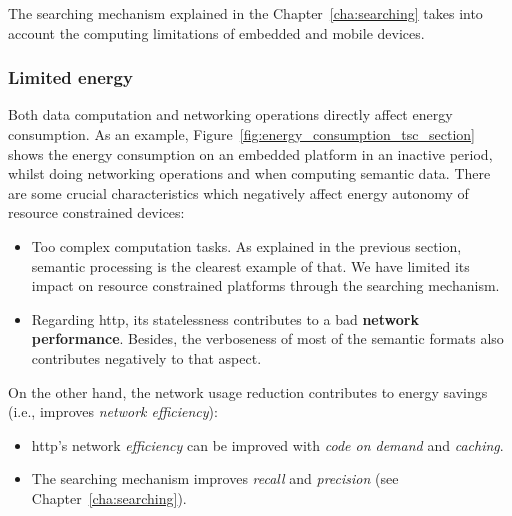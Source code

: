 The searching mechanism explained in the Chapter~\ref{cha:searching} takes into account the computing limitations of embedded and mobile devices.



\subsubsection{Limited energy}

Both data computation and networking operations directly affect energy consumption.
As an example, Figure~\ref{fig:energy_consumption_tsc_section} shows the energy consumption on an embedded platform in an inactive period, whilst doing networking operations and when computing semantic data. %
There are some crucial characteristics which negatively affect energy autonomy of resource constrained devices:
\begin{itemize}
  \item Too complex computation tasks.
        As explained in the previous section, semantic processing is the clearest example of that.
        We have limited its impact on resource constrained platforms through the searching mechanism.
  \item Regarding \ac{http}, its statelessness contributes to a bad \textbf{network performance}.
        Besides, the verboseness of most of the semantic formats also contributes negatively to that aspect.
\end{itemize}




On the other hand, the network usage reduction contributes to energy savings (i.e., improves \emph{network efficiency}):
\begin{itemize}
  \item \ac{http}'s network \emph{efficiency} can be improved with \emph{code on demand} and \emph{caching}.
  \item The searching mechanism improves \emph{recall} and \emph{precision} (see Chapter~\ref{cha:searching}).
\end{itemize}





